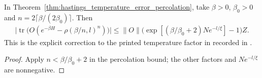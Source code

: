 \begin{corollary}
    \label{cor:hastings_temperature_error_add_two}
    \leanok
    In Theorem~\ref{thm:hastings_temperature_error_percolation}, take
    $\beta>0$, $\beta_0>0$ and
    $n=2\lceil\beta/(2\beta_0)\rceil$. Then
    \begin{align*}
        \bigl|\operatorname{tr}\bigl(O(e^{-\beta H}-\rho(\beta/n,l)^n)\bigr)\bigr|
        \le\|O\|\bigl(\exp[(\beta/\beta_0+2)Ne^{-l/\xi}]-1\bigr)Z.
    \end{align*}
    This is the explicit correction to the printed temperature factor
    in \cite[lines 1342--1347]{Hastings2006Solving}
    recorded in \cite{gap:hastings05_temperature_factor_count}.
\end{corollary}
\begin{proof}\leanok
    Apply $n<\beta/\beta_0+2$ in the percolation bound; the other
    factors and $Ne^{-l/\xi}$ are nonnegative.
\end{proof}
